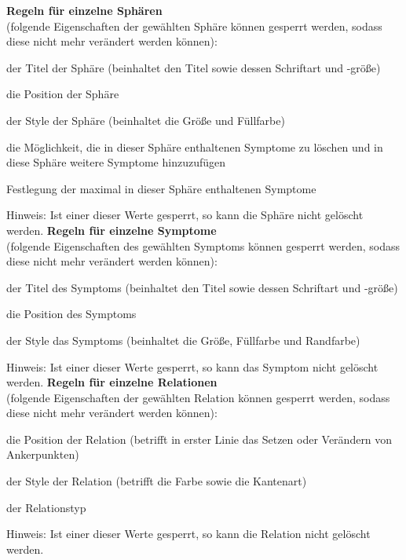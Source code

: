 \documentclass[enabledeprecatedfontcommands,fontsize=11pt,paper=a4,twoside]{scrartcl}
\newcommand*{\bbe}{\textcolor{bbe}}
\newcounter{one}
\let\origenumerate\enumerate
\let\origendenumerate\endenumerate
\renewenvironment{enumerate}{\origenumerate \addtolength{\itemsep}{-10.0pt}}{\origendenumerate}
\begin{document}
\textbf{\bbe{Regeln für einzelne Sphären}}\\
(folgende Eigenschaften der gewählten Sphäre können gesperrt werden, sodass diese nicht mehr verändert werden können): 
\begin{enumerate}
	\item der Titel der Sphäre (beinhaltet den Titel sowie dessen Schriftart und -größe)
	\item die Position der Sphäre
	\item der Style der Sphäre (beinhaltet die Größe und Füllfarbe)
	\item die Möglichkeit, die in dieser Sphäre enthaltenen Symptome zu löschen und in diese Sphäre weitere Symptome hinzuzufügen
	\item Festlegung der maximal in dieser Sphäre enthaltenen Symptome
	\item Hinweis: Ist einer dieser Werte gesperrt, so kann die Sphäre nicht gelöscht werden.
\end{enumerate}
\textbf{\bbe{Regeln für einzelne Symptome}}\\
(folgende Eigenschaften des gewählten Symptoms können gesperrt werden, sodass diese nicht mehr verändert werden können):
\begin{enumerate}
	\item der Titel des Symptoms (beinhaltet den Titel sowie dessen Schriftart und -größe)
	\item die Position des Symptoms
	\item der Style das Symptoms (beinhaltet die Größe, Füllfarbe und Randfarbe)
	\item Hinweis: Ist einer dieser Werte gesperrt, so kann das Symptom nicht gelöscht werden.
\end{enumerate}
\textbf{\bbe{Regeln für einzelne Relationen}}\\
(folgende Eigenschaften der gewählten Relation können gesperrt werden, sodass diese nicht mehr verändert werden können):
\begin{enumerate}
	\item die Position der Relation (betrifft in erster Linie das Setzen oder Verändern von Ankerpunkten)
	\item der Style der Relation (betrifft die Farbe sowie die Kantenart)
	\item der Relationstyp
	\item Hinweis: Ist einer dieser Werte gesperrt, so kann die Relation nicht gelöscht werden.
\end{enumerate}
\end{document}
